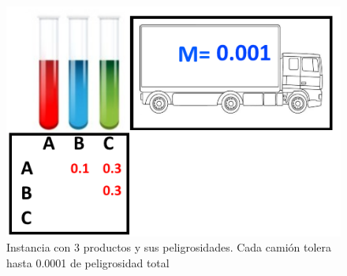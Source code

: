 \begin{figure}[H]
\centering
\includegraphics[scale=0.65]{ej3/instancia2.png}
\caption{Instancia con 3 productos y sus peligrosidades. Cada camión tolera hasta 0.0001 de peligrosidad total}
\end{figure}


